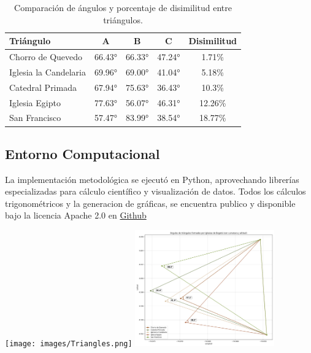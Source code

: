 \documentclass[a4paper,alpha-refs]{eSpectra}
\begin{document}
\begin{table}[h!]
\centering
\begin{tabular}{|l|c|c|c|c|}
\hline
\textbf{Triángulo} & \textbf{A} & \textbf{B} & \textbf{C} & \textbf{Disimilitud} \\ \hline
Chorro de Quevedo & 66.43° & 66.33° & 47.24° & 1.71\% \\ \hline
Iglesia la Candelaria & 69.96° & 69.00° & 41.04° & 5.18\% \\ \hline
Catedral Primada & 67.94° & 75.63° & 36.43° & 10.3\% \\ \hline
Iglesia Egipto & 77.63° & 56.07° & 46.31° & 12.26\% \\ \hline
San Francisco & 57.47° & 83.99° & 38.54° & 18.77\% \\ \hline
\end{tabular}
\caption{Comparación de ángulos y porcentaje de disimilitud entre triángulos.}
\end{table}
\vspace{-\baselineskip}  %
\vspace{-0.5\baselineskip}  %

\subsection{Entorno Computacional}
La implementación metodológica se ejecutó en Python, aprovechando librerías especializadas para cálculo científico y visualización de datos. Todos los cálculos trigonométricos y la generacion de gráficas, se encuentra publico y disponible bajo la licencia Apache 2.0 en \href{https://github.com/Usuy-Leon/El-secreto-astronomico-de-Guadalupe-Monserrate}{Github}

\centering
   \texttt{[image: images/Triangles.png]}
   \includegraphics[width=0.45\textwidth]{images/triangles_with_arcs.png}
\end{document}
